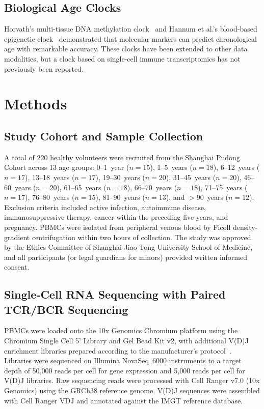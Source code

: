 \documentclass[11pt]{article}
\begin{document}
\subsection{Biological Age Clocks}

Horvath's multi-tissue DNA methylation clock~\citep{horvath2013dna} and Hannum et al.'s blood-based epigenetic clock~\citep{hannum2013genome} demonstrated that molecular markers can predict chronological age with remarkable accuracy. These clocks have been extended to other data modalities, but a clock based on single-cell immune transcriptomics has not previously been reported.

\section{Methods}

\subsection{Study Cohort and Sample Collection}

A total of 220 healthy volunteers were recruited from the Shanghai Pudong Cohort across 13 age groups: 0--1~year ($n=15$), 1--5~years ($n=18$), 6--12~years ($n=17$), 13--18~years ($n=17$), 19--30~years ($n=20$), 31--45~years ($n=20$), 46--60~years ($n=20$), 61--65~years ($n=18$), 66--70~years ($n=18$), 71--75~years ($n=17$), 76--80~years ($n=15$), 81--90~years ($n=13$), and $>$90~years ($n=12$). Exclusion criteria included active infection, autoimmune disease, immunosuppressive therapy, cancer within the preceding five years, and pregnancy. PBMCs were isolated from peripheral venous blood by Ficoll density-gradient centrifugation within two hours of collection. The study was approved by the Ethics Committee of Shanghai Jiao Tong University School of Medicine, and all participants (or legal guardians for minors) provided written informed consent.

\subsection{Single-Cell RNA Sequencing with Paired TCR/BCR Sequencing}

PBMCs were loaded onto the 10x Genomics Chromium platform using the Chromium Single Cell 5' Library and Gel Bead Kit v2, with additional V(D)J enrichment libraries prepared according to the manufacturer's protocol~\citep{zheng2017massively}. Libraries were sequenced on Illumina NovaSeq~6000 instruments to a target depth of 50{,}000 reads per cell for gene expression and 5{,}000 reads per cell for V(D)J libraries. Raw sequencing reads were processed with Cell Ranger v7.0 (10x Genomics) using the GRCh38 reference genome. V(D)J sequences were assembled with Cell Ranger VDJ and annotated against the IMGT reference database.
\end{document}
